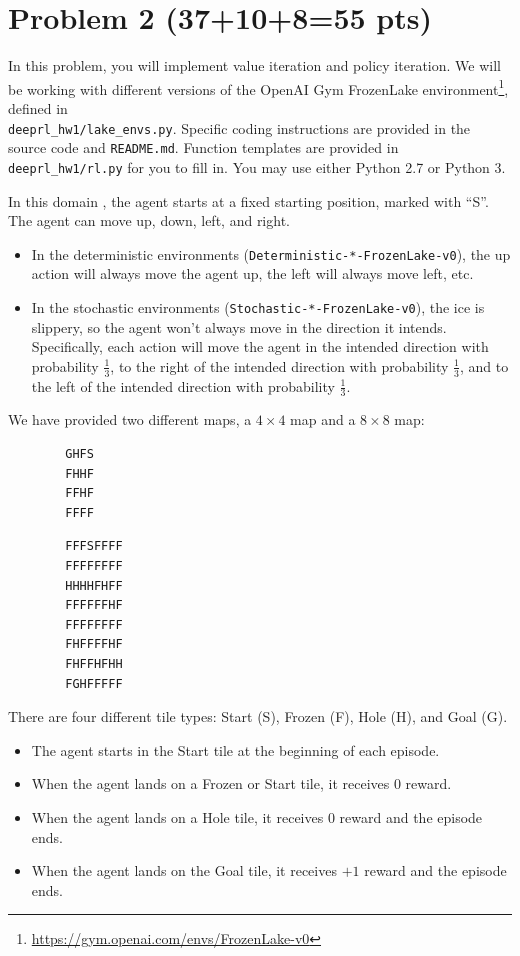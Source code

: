 \documentclass[12pt]{article}
\begin{document}
\section*{Problem 2 (37+10+8=55 pts)}

In this problem, you will implement value iteration and policy iteration. We will be working with different versions of the OpenAI Gym FrozenLake environment\footnote{\url{https://gym.openai.com/envs/FrozenLake-v0}}, defined in \\
\texttt{deeprl\_hw1/lake\_envs.py}. Specific coding instructions are provided in the source code and \texttt{README.md}. Function templates are provided in \texttt{deeprl\_hw1/rl.py} for you to fill in. You may use either Python 2.7 or Python 3. 

In this domain , the agent starts at a fixed starting position, marked with ``S''. The agent can move up, down, left, and right.
\begin{itemize}
\item In the deterministic environments (\texttt{Deterministic-*-FrozenLake-v0}), the up action will always move the agent up, the left will always move left, etc.
\item In the stochastic environments (\texttt{Stochastic-*-FrozenLake-v0}), the ice is slippery, so the agent won't always move in the direction it intends. Specifically, each action will move the agent in the intended direction with probability $\frac{1}{3}$, to the right of the intended direction with probability $\frac{1}{3}$, and to the left of the intended direction with probability $\frac{1}{3}$.
\end{itemize}

We have provided two different maps, a $4 \times 4$ map and a $8 \times 8$ map:
\begin{center}
  \begin{minipage}[c]{0.3\textwidth}
    \begin{BVerbatim}
        GHFS
        FHHF
        FFHF
        FFFF
    \end{BVerbatim}
\end{minipage}%
%
\begin{minipage}[c]{0.3\textwidth}
    \begin{BVerbatim}
        FFFSFFFF
        FFFFFFFF
        HHHHFHFF
        FFFFFFHF
        FFFFFFFF
        FHFFFFHF
        FHFFHFHH
        FGHFFFFF
    \end{BVerbatim}
\end{minipage}%
\end{center}
There are four different tile types: Start (S), Frozen (F), Hole (H), and Goal (G).
\begin{itemize}
\item The agent starts in the Start tile at the beginning of each episode.
\item When the agent lands on a Frozen or Start tile, it receives {\color{red} $0$} reward.
\item When the agent lands on a Hole tile, it receives $0$ reward and the episode ends.
\item When the agent lands on the Goal tile, it receives $+1$ reward and the episode ends.
\end{itemize}
\end{document}
